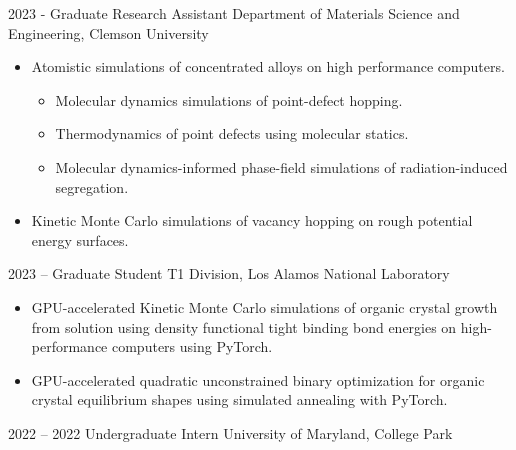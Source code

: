 \documentclass[9pt]{developercv} %
\begin{document}
\vspace{-10 pt}
\begin{entrylist}
	\entry
        {2023 -}
		{Graduate Research Assistant}
		{Department of Materials Science and Engineering, Clemson University}
		{\vspace{-10pt}
        \begin{itemize}[noitemsep,topsep=0pt,parsep=0pt,partopsep=0pt, leftmargin=-1pt]
            \item Atomistic simulations of concentrated alloys on high performance computers.
            \begin{itemize}%
                \item Molecular dynamics simulations of point-defect hopping.
                \item Thermodynamics of point defects using molecular statics.
                \item Molecular dynamics-informed phase-field simulations of radiation-induced segregation.
            \end{itemize}
            \item Kinetic Monte Carlo simulations of vacancy hopping on rough potential energy surfaces.
        \end{itemize} 
        }
	\entry
		{2023 --}
		{Graduate Student}
		{T1 Division, Los Alamos National Laboratory}
		{\vspace{-10pt}
        \begin{itemize}[noitemsep,topsep=0pt,parsep=0pt,partopsep=0pt, leftmargin=-1pt]
            \item GPU-accelerated Kinetic Monte Carlo simulations of organic crystal growth from solution using density functional tight binding bond energies on high-performance computers using PyTorch.
            \item GPU-accelerated quadratic unconstrained binary optimization for organic crystal equilibrium shapes using simulated annealing with PyTorch.
        \end{itemize} 
        }
	\entry
		{2022 -- 2022}
		{Undergraduate Intern}
		{University of Maryland, College Park}
		{\vspace{-10pt}
        \begin{itemize}[noitemsep,topsep=0pt,parsep=0pt,partopsep=0pt, leftmargin=-1pt]

\end{itemize}}
\end{entrylist}
\end{document}
